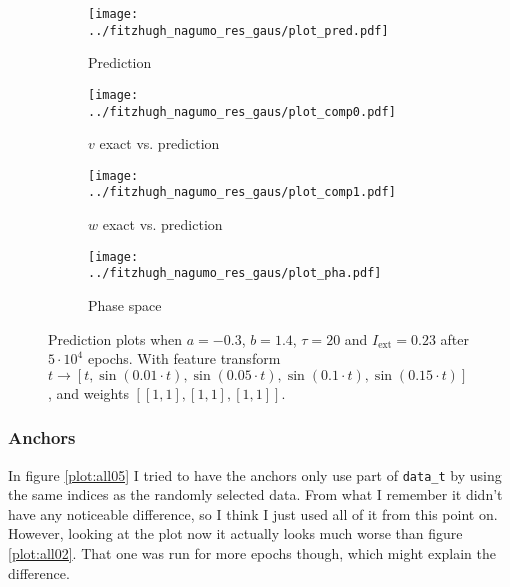 \documentclass[a4paper]{article}
\begin{document}
\begin{figure}[H]
	\centering 
	\begin{subfigure}[b]{0.47\textwidth}
		\centering
		\texttt{[image: ../fitzhugh\_nagumo\_res\_gaus/plot\_pred.pdf]}
		\caption{Prediction}
		\label{fig:all04a}
	\end{subfigure}
	\begin{subfigure}[b]{0.47\textwidth}
		\centering
		\texttt{[image: ../fitzhugh\_nagumo\_res\_gaus/plot\_comp0.pdf]}
		\caption{$v$ exact vs. prediction}
		\label{fig:all04b}
	\end{subfigure}
	\begin{subfigure}[b]{0.47\textwidth}
		\centering
		\texttt{[image: ../fitzhugh\_nagumo\_res\_gaus/plot\_comp1.pdf]}
		\caption{$w$ exact vs. prediction}
		\label{fig:all04c}
	\end{subfigure}
	\begin{subfigure}[b]{0.47\textwidth}
		\centering
		\texttt{[image: ../fitzhugh\_nagumo\_res\_gaus/plot\_pha.pdf]}
		\caption{Phase space}
		\label{fig:all04d}
	\end{subfigure}
	\caption{Prediction plots when $a=-0.3$, $b=1.4$, $\tau=20$ and $ I_{\text{ext}}=0.23$ after $5\cdot10^4$ epochs. With feature transform $t \rightarrow \left[ t, \sin(0.01 \cdot  t), \sin(0.05 \cdot  t), \sin(0.1 \cdot  t), \sin(0.15 \cdot  t)\right] $, and weights $\left[ \left[ 1, 1\right], \left[ 1, 1\right], \left[ 1, 1\right]\right]$.}
	\label{plot:all04}
\end{figure}



\subsubsection{Anchors}

In figure \ref{plot:all05} I tried to have the anchors only use part of \lstinline|data_t| by using the same indices as the randomly selected data. From what I remember it didn't have any noticeable difference, so I think I just used all of it from this point on. However, looking at the plot now it actually looks much worse than figure \ref{plot:all02}. That one was run for more epochs though, which might explain the difference. 
\end{document}
